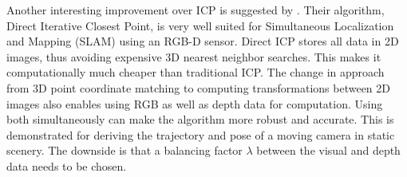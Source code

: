 Another interesting improvement over ICP is suggested by \citet{tykkala2011direct}. Their algorithm, Direct Iterative Closest Point, is very well suited for Simultaneous Localization and Mapping (SLAM) using an RGB-D sensor. Direct ICP stores all data in 2D images, thus avoiding expensive 3D nearest neighbor searches. This makes it computationally much cheaper than traditional ICP. The change in approach from 3D point coordinate matching to computing transformations between 2D images also enables using RGB as well as depth data for computation. Using both simultaneously can make the algorithm more robust and accurate. This is demonstrated for deriving the trajectory and pose of a moving camera in static scenery. The downside is that a balancing factor $\lambda$ between the visual and depth data needs to be chosen.


\newtopic

